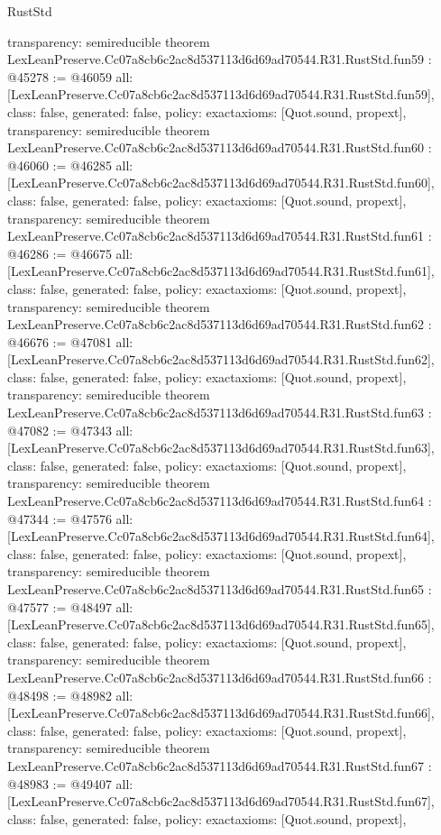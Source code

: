 \begin{lexlean}{RustStd}
\begin{coremodule}
{  transparency: semireducible
}
theorem LexLeanPreserve.Cc07a8cb6c2ac8d537113d6d69ad70544.R31.RustStd.fun59 : @45278 := @46059 {
  all: [LexLeanPreserve.Cc07a8cb6c2ac8d537113d6d69ad70544.R31.RustStd.fun59],
  class: false,
  generated: false,
  policy: exact{axioms: [Quot.sound, propext]},
  transparency: semireducible
}
theorem LexLeanPreserve.Cc07a8cb6c2ac8d537113d6d69ad70544.R31.RustStd.fun60 : @46060 := @46285 {
  all: [LexLeanPreserve.Cc07a8cb6c2ac8d537113d6d69ad70544.R31.RustStd.fun60],
  class: false,
  generated: false,
  policy: exact{axioms: [Quot.sound, propext]},
  transparency: semireducible
}
theorem LexLeanPreserve.Cc07a8cb6c2ac8d537113d6d69ad70544.R31.RustStd.fun61 : @46286 := @46675 {
  all: [LexLeanPreserve.Cc07a8cb6c2ac8d537113d6d69ad70544.R31.RustStd.fun61],
  class: false,
  generated: false,
  policy: exact{axioms: [Quot.sound, propext]},
  transparency: semireducible
}
theorem LexLeanPreserve.Cc07a8cb6c2ac8d537113d6d69ad70544.R31.RustStd.fun62 : @46676 := @47081 {
  all: [LexLeanPreserve.Cc07a8cb6c2ac8d537113d6d69ad70544.R31.RustStd.fun62],
  class: false,
  generated: false,
  policy: exact{axioms: [Quot.sound, propext]},
  transparency: semireducible
}
theorem LexLeanPreserve.Cc07a8cb6c2ac8d537113d6d69ad70544.R31.RustStd.fun63 : @47082 := @47343 {
  all: [LexLeanPreserve.Cc07a8cb6c2ac8d537113d6d69ad70544.R31.RustStd.fun63],
  class: false,
  generated: false,
  policy: exact{axioms: [Quot.sound, propext]},
  transparency: semireducible
}
theorem LexLeanPreserve.Cc07a8cb6c2ac8d537113d6d69ad70544.R31.RustStd.fun64 : @47344 := @47576 {
  all: [LexLeanPreserve.Cc07a8cb6c2ac8d537113d6d69ad70544.R31.RustStd.fun64],
  class: false,
  generated: false,
  policy: exact{axioms: [Quot.sound, propext]},
  transparency: semireducible
}
theorem LexLeanPreserve.Cc07a8cb6c2ac8d537113d6d69ad70544.R31.RustStd.fun65 : @47577 := @48497 {
  all: [LexLeanPreserve.Cc07a8cb6c2ac8d537113d6d69ad70544.R31.RustStd.fun65],
  class: false,
  generated: false,
  policy: exact{axioms: [Quot.sound, propext]},
  transparency: semireducible
}
theorem LexLeanPreserve.Cc07a8cb6c2ac8d537113d6d69ad70544.R31.RustStd.fun66 : @48498 := @48982 {
  all: [LexLeanPreserve.Cc07a8cb6c2ac8d537113d6d69ad70544.R31.RustStd.fun66],
  class: false,
  generated: false,
  policy: exact{axioms: [Quot.sound, propext]},
  transparency: semireducible
}
theorem LexLeanPreserve.Cc07a8cb6c2ac8d537113d6d69ad70544.R31.RustStd.fun67 : @48983 := @49407 {
  all: [LexLeanPreserve.Cc07a8cb6c2ac8d537113d6d69ad70544.R31.RustStd.fun67],
  class: false,
  generated: false,
  policy: exact{axioms: [Quot.sound, propext]},
}
\end{coremodule}
\end{lexlean}
